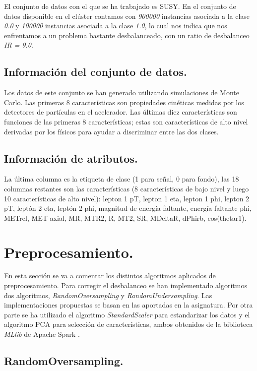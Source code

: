 \documentclass[11pt]{article}
\begin{document}
El conjunto de datos con el que se ha trabajado es SUSY. En el conjunto de datos disponible en el clúster contamos con \textit{900000} instancias asociada a la clase \textit{0.0} y \textit{100000} instancias asociada a la clase \textit{1.0}, lo cual nos indica que nos enfrentamos a un problema bastante desbalanceado, con un ratio de desbalanceo \textit{IR = 9.0}.

\subsection{Información del conjunto de datos.}

Los datos de este conjunto se han generado utilizando simulaciones de Monte Carlo. Las primeras 8 características son propiedades cinéticas medidas por los detectores de partículas en el acelerador. Las últimas diez características son funciones de las primeras 8 características; estas son características de alto nivel derivadas por los físicos para ayudar a discriminar entre las dos clases. 

\subsection{Información de atributos.}

La última columna es la etiqueta de clase (1 para señal, 0 para fondo), las 18 columnas restantes son las características (8 características de bajo nivel y luego 10 características de alto nivel): lepton 1 pT, lepton 1 eta, lepton 1 phi, lepton 2 pT, leptón 2 eta, leptón 2 phi, magnitud de energía faltante, energía faltante phi, METrel, MET axial, MR, MTR2, R, MT2, SR, MDeltaR, dPhirb, cos(thetar1).

\section{Preprocesamiento.}

En esta sección se va a comentar los distintos algoritmos aplicados de preprocesamiento. Para corregir el desbalanceo se han implementado algoritmos dos algoritmos, \textit{RandomOversampling} y \textit{RandomUndersampling}. Las implementaciones propuestas se basan en las aportadas en la asignatura.
Por otra parte se ha utilizado el algoritmo \textit{StandardScaler} para estandarizar los datos y el algoritmo PCA para selección de características, ambos obtenidos de la biblioteca \textit{MLlib} de Apache Spark .

\subsection{RandomOversampling.}
\end{document}

